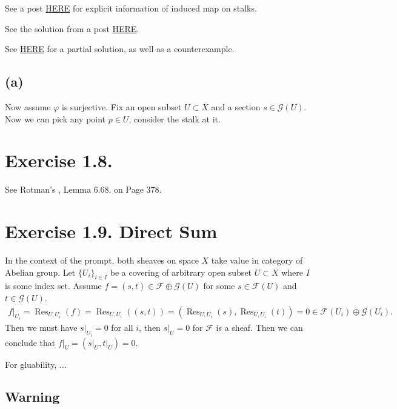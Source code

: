 See a post \href{https://math.stackexchange.com/questions/1387214/the-induced-map-on-stalks-is-well-defined}{HERE} for explicit information of induced map on stalks. 

See the solution from a post \href{https://math.stackexchange.com/questions/4450406/surjective-morphism-of-sheaves}{HERE}.

See \href{https://www.math.arizona.edu/~cais/CourseNotes/AlgGeom04/Hartshorne_Solutions.pdf}{HERE} for a partial solution, as well as a counterexample. 
\subsection{(a)}

Now assume $\varphi$ is surjective. Fix an open subset $U\subset X$ and a section $s\in\mathscr G(U)$. Now we can pick any point $p\in U$, consider the stalk at it.


\section{Exercise 1.8.}

See Rotman's \cite{rotman2009introduction}, Lemma 6.68. on Page 378.

\section{Exercise 1.9. Direct Sum}\label{Hart Ex 1.9.}

In the context of the prompt, both sheaves on space $X$ take value in category of Abelian group. Let $\{U_i\}_{i\in I}$ be a covering of arbitrary open subset $U\subset X$ where $I$ is some index set. Assume $f=(s,t)\in \mathscr F\oplus\mathscr G(U)$ for some $s\in\mathscr F(U)$ and $t\in\mathscr G(U)$. 
\begin{align*}
    f\vert_{U_i}=\operatorname{Res}_{U,U_i}(f)=\operatorname{Res}_{U,U_i}((s,t))=(\operatorname{Res}_{U,U_i}(s),\operatorname{Res}_{U,U_i}(t))=0\in \mathscr F(U_i)\oplus\mathscr G(U_i).
\end{align*}
Then we must have $s\vert_{U_i}=0$ for all $i$, then $s\vert_U=0$ for $\mathscr F$ is a sheaf. Then we can conclude that $f\vert_{U}=(s\vert_U,t\vert_U)=0$.

For gluability, ...

\subsection{Warning}

